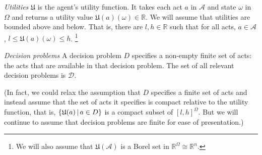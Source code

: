 \documentclass[a4paper,final]{article}
\newcommand\A{\mathcal{A}}
\renewcommand\P{\mathbb{P}} %
\newcommand\EU{\mathrm{EU}}
\newcommand\REU{\mathrm{REU}}
\newcommand\EAd{\mathrm{EAd}}
\newcommand\U{\mathfrak{U}} %
\newcommand\Maximin{\Gamma}
\newcommand{\D}{\mathcal{D}}
\renewcommand\S{\mathcal{S}}
\renewcommand\c{\mathsf{c}} %
\newcommand{\IP}{\P}
\renewcommand{\Re}{\mathbb{R}}
\newcommand{\todoold}[2][]{\todo[backgroundcolor=white,bordercolor=orange!10,linecolor=gray!10, #1,caption={},textcolor=gray]{Pre-rev: #2}}
\newcommand\SetDelimiter[1][]{
	\nonscript\,#1\vert \allowbreak \nonscript\,\mathopen{}}
\providecommand\given{\SetDelimiter}
\renewcommand{\emptyset}{\varnothing}
\renewcommand{\leq}{\leqslant}
\newenvironment{CCM rewritten}
{\begingroup\color{blue}} %
{\endgroup}              %
\begin{document}
 \emph{Utilities } $\U$ is the agent's utility function. It takes each act $a$ in $\A$ and state $\omega$ in $\Omega$ and returns a utility value $\U(a)(\omega)\in\Re$. We will assume that utilities are bounded above and below. That is, there are $l,h\in\Re$ such that for all acts, $a\in\A$, $l\leq \U(a)(\omega)\leq h$.%
 \footnote{We will also assume that $\U(\A)$ is a Borel set in $\Re^\Omega\cong\Re^n$.}%

\emph{Decision problems } A decision problem $D$ specifies a non-empty finite set of acts: the acts that are available in that decision problem. The set of all relevant decision problems is $\D$. %

(In fact, we could relax the assumption that $D$ specifies a finite set of acts and instead assume that the set of acts it specifies is compact relative to the utility function, that is, $\{\U(a)\given a \in D\}$ is a compact subset of $[l,h]^\Omega$. But we will continue to assume that decision problems are finite for ease of presentation.)


\end{document}
